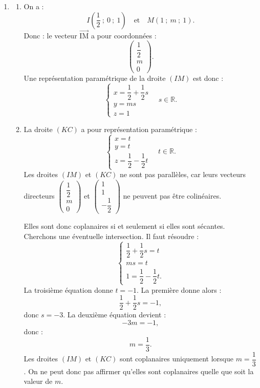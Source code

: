 \documentclass[10pt]{article}
\providecommand{\R}{\mathbb{R}}
\providecommand{\vectt}[1]{\overrightarrow{\mathrm{#1}}}
\begin{document}
\begin{enumerate}
	\item \begin{enumerate}
		\item On a :
		\[
		I\left(\dfrac12~;~0~;~1\right)
		\quad\text{et}\quad
		M(1~;~m~;~1).
		\]
		Donc :
		le vecteur $\vectt{IM}$ a pour coordonnées :
		\[
		\begin{pmatrix}\dfrac12\\m\\0\end{pmatrix}.
		\]
		Une représentation paramétrique de la droite $(IM)$ est donc :
		\[
		\begin{cases}
		x=\dfrac12+\dfrac12s\\
		y=ms\\
		z=1
		\end{cases}
		\quad s\in\R.
		\]

		\item La droite $(KC)$ a pour représentation paramétrique :
		\[
		\begin{cases}
		x=t\\
		y=t\\
		z=\dfrac12-\dfrac12t
		\end{cases}
		\quad t\in\R.
		\]
		Les droites $(IM)$ et $(KC)$ ne sont pas parallèles, car leurs vecteurs directeurs
		$\begin{pmatrix}\dfrac12\\m\\0\end{pmatrix}$ et $\begin{pmatrix}1\\1\\-\dfrac12\end{pmatrix}$ ne peuvent pas être colinéaires.

		Elles sont donc coplanaires si et seulement si elles sont sécantes.
		Cherchons une éventuelle intersection. Il faut résoudre :
		\[
		\begin{cases}
		\dfrac12+\dfrac12s=t\\
		ms=t\\
		1=\dfrac12-\dfrac12t.
		\end{cases}
		\]
		La troisième équation donne $t=-1$.
		La première donne alors :
		\[
		\dfrac12+\dfrac12s=-1,
		\]
		donc $s=-3$.
		La deuxième équation devient :
		\[
		-3m=-1,
		\]
		donc :
		\[
		m=\dfrac13.
		\]
		Les droites $(IM)$ et $(KC)$ sont coplanaires uniquement lorsque $m=\dfrac13$.
		On ne peut donc pas affirmer qu'elles sont coplanaires quelle que soit la valeur de $m$.
	\end{enumerate}
\end{enumerate}
\end{document}
